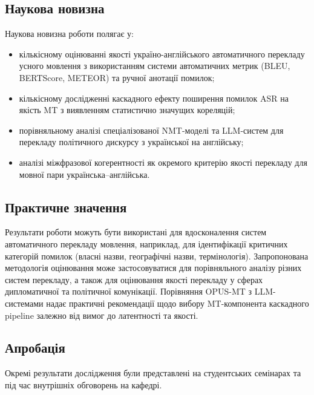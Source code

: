 \subsection{Наукова новизна}

Наукова новизна роботи полягає у:
\begin{itemize}[nosep]
    \item кількісному оцінюванні якості україно-англійського
    автоматичного перекладу усного мовлення з використанням системи
    автоматичних метрик (BLEU, BERTScore, METEOR) та ручної анотації помилок;
    \item кількісному дослідженні каскадного ефекту поширення помилок ASR
    на якість MT з виявленням статистично значущих кореляцій;
    \item порівняльному аналізі спеціалізованої NMT-моделі та LLM-систем
    для перекладу політичного дискурсу з української на англійську;
    \item аналізі міжфразової когерентності як окремого критерію якості
    перекладу для мовної пари українська--англійська.
\end{itemize}

\subsection{Практичне значення}

Результати роботи можуть бути використані для вдосконалення систем
автоматичного перекладу мовлення, наприклад, для ідентифікації критичних
категорій помилок (власні назви, географічні назви, термінологія).
Запропонована методологія оцінювання може застосовуватися для порівняльного
аналізу різних систем перекладу, а також для оцінювання якості перекладу
у сферах дипломатичної та політичної комунікації. Порівняння OPUS-MT з LLM-системами надає практичні рекомендації щодо вибору
MT-компонента каскадного pipeline залежно від вимог до латентності та якості.

\subsection{Апробація}

Окремі результати дослідження були представлені на студентських семінарах та
під час внутрішніх обговорень на кафедрі.

\clearpage
